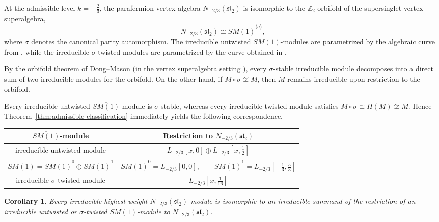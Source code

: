 \documentclass[11 pt]{amsart}
\newtheorem{corollary}{Corollary}
\theoremstyle{definition}
\theoremstyle{plain}
\begin{document}
At the admissible level $k=-\frac23$,
the parafermion vertex algebra
$N_{-2/3}(\mathfrak{sl}_2)$
is isomorphic to the $\mathbb Z_2$-orbifold of the supersinglet vertex
superalgebra,
\[
N_{-2/3}(\mathfrak{sl}_2)
\cong\overline{SM(1)}^{\langle\sigma\rangle},
\]
where $\sigma$ denotes the canonical parity automorphism.
The irreducible untwisted $\overline{SM(1)}$-modules are parametrized by
the algebraic curve from \cite{AMSuperTriplet},
while the irreducible $\sigma$-twisted modules are parametrized by the
curve obtained in \cite{AMSuperTripletTwisted}.

By the orbifold theorem of Dong--Mason \cite{DM} (in the vertex superalgebra
setting \cite{ALPY}), every $\sigma$-stable irreducible module decomposes into a
direct sum of two irreducible modules for the orbifold. On the other
hand, if
$M\circ\sigma\not\cong M$,
then $M$ remains irreducible upon restriction to the orbifold.

Every irreducible untwisted $\overline{SM(1)}$-module is
$\sigma$-stable, whereas every irreducible twisted module satisfies
$M\circ\sigma\cong\Pi(M)\not\cong M$.
Hence Theorem~\ref{thm:admissible-classification} immediately yields the
following correspondence.

\medskip

\renewcommand{\arraystretch}{1.25}
\begin{center}
\begin{tabular}{|c|c|}
\hline
$\overline{SM(1)}$-module &
Restriction to
$N_{-2/3}(\mathfrak{sl}_2)$
\\
\hline
irreducible untwisted module &
$L_{-2/3}[x,0]
\oplus
L_{-2/3}\!\left[x,\frac12\right]$
\\
\hline
$\overline{SM(1)}
=
\overline{SM(1)}^{\bar0}
\oplus
\overline{SM(1)}^{\bar1}$ &
$\overline{SM(1)}^{\bar0}
=
L_{-2/3}[0,0],\qquad
\overline{SM(1)}^{\bar1}
=
L_{-2/3}\!\left[-\frac13,\frac53\right]$
\\
\hline
irreducible $\sigma$-twisted module &
$L_{-2/3}\!\left[x,\frac1{16}\right]$
\\
\hline
\end{tabular}
\end{center}

\begin{corollary}
Every irreducible highest weight
$N_{-2/3}(\mathfrak{sl}_2)$-module
is isomorphic to an irreducible summand of the restriction of an
irreducible untwisted or $\sigma$-twisted
$\overline{SM(1)}$-module to
$N_{-2/3}(\mathfrak{sl}_2)$.
\end{corollary}
\end{document}
